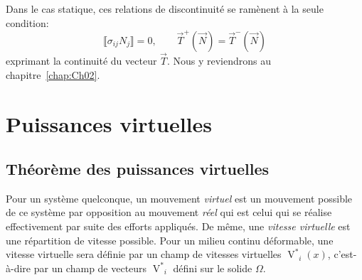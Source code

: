 Dans le cas statique, ces relations de discontinuité se ramènent à la seule condition:
\begin{equation}
    \llbracket\sigma_{ij}N_j\rrbracket=0,\qquad \vec{T}^+(\vec{N})=\vec{T}^-(\vec{N})
    \label{eq:Ch01-022}
\end{equation}
exprimant la continuité du vecteur $\vec{T}$.
Nous y reviendrons au chapitre~\ref{chap:Ch02}.
\section{Puissances virtuelles} \label{sec:Ch01-2}
\subsection{Théorème des puissances virtuelles} \label{ssec:Ch01-2.1}
Pour un système quelconque, un mouvement \emph{virtuel} est un mouvement possible de ce système par opposition au mouvement \emph{réel} qui est celui qui se réalise effectivement par suite des efforts appliqués.
De même, une \emph{vitesse virtuelle} est une répartition de vitesse possible.
Pour un milieu continu déformable, une vitesse virtuelle sera définie par un champ de vitesses virtuelles ${\mathop{V}^{*}}_i(x)$, c'est-à-dire par un champ de vecteurs ${\mathop{V}^{*}}_i$ défini sur le solide $\Omega$.

